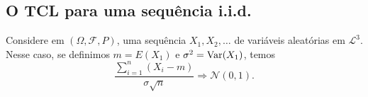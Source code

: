 \newpage

\subsection{O TCL para uma sequência i.i.d.}

\begin{theorem}
  \label{t:tcl_iid}
  Considere em $(\Omega, \mathcal{F}, P)$, uma sequência $X_1, X_2, \dots$ de variáveis aleatórias \iid em $\mathcal{L}^3$.
  Nesse caso, se definimos $m = E(X_1)$ e $\sigma^2 = \operatorname{Var}(X_1)$, temos
  \begin{equation}
    \frac{\sum_{i=1}^n (X_i - m)}{\sigma \sqrt{n}} \Rightarrow \mathcal{N}(0,1).
  \end{equation}
\end{theorem}

